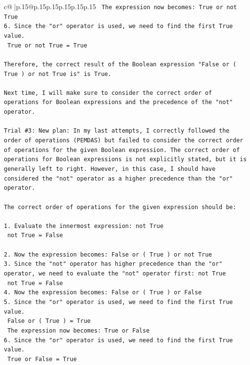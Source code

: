 \documentclass{article}
\begin{document}
{\begin{supertabular}{c@{$\;$}|p{.15\linewidth}@{}p{.15\linewidth}p{.15\linewidth}p{.15\linewidth}p{.15\linewidth}p{.15\linewidth}}
{{{\texttt{   The expression now becomes: True or not True} \\
\texttt{6. Since the "or" operator is used, we need to find the first True value. } \\
\texttt{   True or not True = True} \\
\\ 
\texttt{Therefore, the correct result of the Boolean expression "False or ( True ) or not True is" is True. } \\
\\ 
\texttt{Next time, I will make sure to consider the correct order of operations for Boolean expressions and the precedence of the "not" operator.} \\
\\ 
\texttt{Trial \#3: New plan: In my last attempts, I correctly followed the order of operations (PEMDAS) but failed to consider the correct order of operations for the given Boolean expression. The correct order of operations for Boolean expressions is not explicitly stated, but it is generally left to right. However, in this case, I should have considered the "not" operator as a higher precedence than the "or" operator. } \\
\\ 
\texttt{The correct order of operations for the given expression should be:} \\
\\ 
\texttt{1. Evaluate the innermost expression: not True} \\
\texttt{   not True = False} \\
\\ 
\texttt{2. Now the expression becomes: False or ( True ) or not True} \\
\texttt{3. Since the "not" operator has higher precedence than the "or" operator, we need to evaluate the "not" operator first: not True} \\
\texttt{   not True = False} \\
\texttt{4. Now the expression becomes: False or ( True ) or False} \\
\texttt{5. Since the "or" operator is used, we need to find the first True value. } \\
\texttt{   False or ( True ) = True} \\
\texttt{   The expression now becomes: True or False} \\
\texttt{6. Since the "or" operator is used, we need to find the first True value. } \\
\texttt{   True or False = True} \\
}}}
\end{supertabular}}
\end{document}
